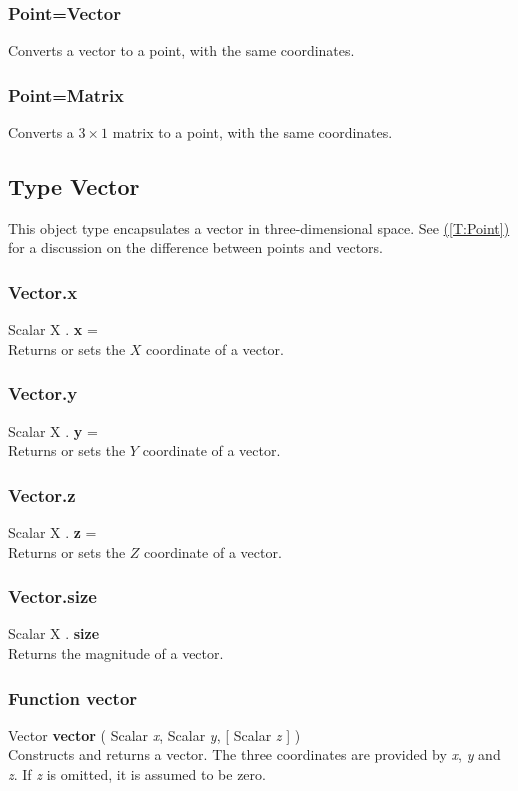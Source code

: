 \documentclass[10pt]{book}
\newcommand{\linkitem}[1]{\hyperref[#1]{\nameref{#1} (\ref{#1})}}
\newcommand{\var}[1]{\textit{#1}}
\begin{document}
\subsubsection{Point=Vector \label{C:Point=Vector}}
Converts a vector to a point, with the same coordinates.

\subsubsection{Point=Matrix \label{C:Point=Matrix}}
Converts a $3 \times 1$ matrix  to a point, with the same coordinates.

\subsection{Type Vector \label{T:Vector}}
This object type encapsulates a vector in three-dimensional space. See \linkitem{T:Point} for a discussion on the difference between points and vectors.

\subsubsection{Vector.x \label{F:Vector:x}}
Scalar X . \textbf{x} = \\
Returns or sets the $X$ coordinate of a vector.

\subsubsection{Vector.y \label{F:Vector:y}}
Scalar X . \textbf{y} = \\
Returns or sets the $Y$ coordinate of a vector.


\subsubsection{Vector.z \label{F:Vector:z}}
Scalar X . \textbf{z} = \\
Returns or sets the $Z$ coordinate of a vector.


\subsubsection{Vector.size \label{F:Vector:size}}
Scalar X . \textbf{size} \\
Returns the magnitude of a vector.

\subsubsection{Function vector \label{F:vector}}
Vector \textbf{vector} ( Scalar \textit{x}, Scalar \textit{y},  [ Scalar \textit{z} ] ) \\
Constructs and returns a vector. The three coordinates are provided by \var{x}, \var{y} and \var{z}. If \var{z} is omitted, it is assumed to be zero.
\end{document}
